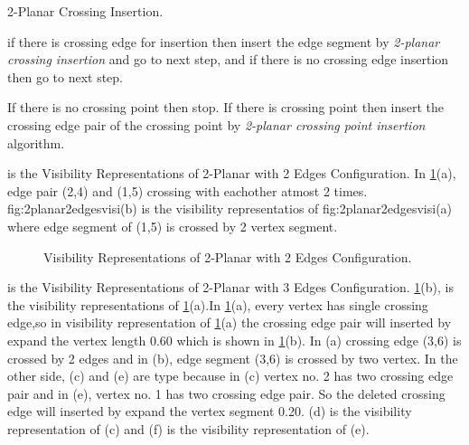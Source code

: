 \begin{algorithm}[H] 
\caption{{2-Planar Crossing Insertion}.}
\label{2pcpi}
\begin{algorithmic}[1]

\STATE if there is crossing edge for insertion then insert the edge segment by \emph{2-planar crossing insertion} and go to next step, and if there is no crossing edge insertion then go to next step.

\STATE If there is no crossing point then stop. If there is crossing point then insert the crossing edge pair of the crossing point by \emph{ 2-planar crossing point insertion} algorithm.


\end{algorithmic}
\end{algorithm}





 is the Visibility Representations of 2-Planar with 2 Edges Configuration. In \cref{fig:2planar2edgesvisi}(a), edge pair (2,4) and (1,5) crossing with eachother atmost 2 times. {fig:2planar2edgesvisi}(b) is the visibility representatios of {fig:2planar2edgesvisi}(a) where edge segment of (1,5) is crossed by 2 vertex segment.

\begin{figure}[!tb]
\centering
\resizebox{70mm}{!}{}
\caption{Visibility Representations of 2-Planar with 2 Edges Configuration.}
\label{fig:2planar2edgesvisi}
\end{figure}



\label{2p3ev}

 is the Visibility Representations of 2-Planar with 3 Edges Configuration. \cref{fig:2planar2edgesvisi}(b), is the visibility representations of \cref{fig:2planar2edgesvisi}(a).In \cref{fig:2planar2edgesvisi}(a), every vertex has single crossing edge,so in visibility representation of \cref{fig:2planar2edgesvisi}(a) the crossing edge pair will inserted by expand the vertex length 0.60 which is shown in \cref{fig:2planar2edgesvisi}(b). In (a) crossing edge (3,6) is crossed by 2 edges and in (b), edge segment (3,6) is crossed by two vertex. In the other side, (c) and (e) are type because in (c) vertex no. 2 has two crossing edge pair and in (e), vertex no. 1 has two crossing edge pair. So the deleted crossing edge will inserted by expand the vertex segment 0.20. (d) is the visibility representation of (c) and (f) is the visibility representation of (e).





